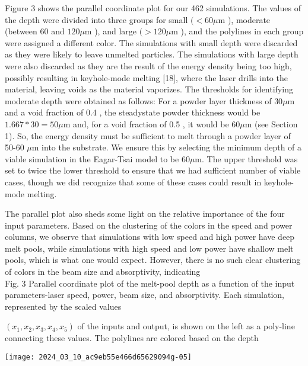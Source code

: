 \documentclass[10pt]{article}
\begin{document}
Figure 3 shows the parallel coordinate plot for our 462 simulations. The values of the depth were divided into three groups for small $(<60 \mu \mathrm{m}$ ), moderate (between 60 and $120 \mu \mathrm{m}$ ), and large $(>120 \mu \mathrm{m}$ ), and the polylines in each group were assigned a different color. The simulations with small depth were discarded as they were likely to leave unmelted particles. The simulations with large depth were also discarded as they are the result of the energy density being too high, possibly resulting in keyhole-mode melting [18], where the laser drills into the material, leaving voids as the material vaporizes. The thresholds for identifying moderate depth were obtained as follows: For a powder layer thickness of $30 \mu \mathrm{m}$ and a void fraction of 0.4 , the steadystate powder thickness would be $1.667 * 30=50 \mu \mathrm{m}$ and, for a void fraction of 0.5 , it would be $60 \mu \mathrm{m}$ (see Section 1). So, the energy density must be sufficient to melt through a powder layer of 50-60 $\mu \mathrm{m}$ into the substrate. We ensure this by selecting the minimum depth of a viable simulation in the Eagar-Tsai model to be $60 \mu \mathrm{m}$. The upper threshold was set to twice the lower threshold to ensure that we had sufficient number of viable cases, though we did recognize that some of these cases could result in keyhole-mode melting.

The parallel plot also sheds some light on the relative importance of the four input parameters. Based on the clustering of the colors in the speed and power columns, we observe that simulations with low speed and high power have deep melt pools, while simulations with high speed and low power have shallow melt pools, which is what one would expect. However, there is no such clear clustering of colors in the beam size and absorptivity, indicating\\
Fig. 3 Parallel coordinate plot of the melt-pool depth as a function of the input parameters-laser speed, power, beam size, and absorptivity. Each simulation, represented by the scaled values

$\left(x_{1}, x_{2}, x_{3}, x_{4}, x_{5}\right)$ of the inputs and output, is shown on the left as a poly-line connecting these values. The polylines are colored based on the depth

\begin{center}
\texttt{[image: 2024\_03\_10\_ac9eb55e466d65629094g-05]}
\end{center}
\end{document}
